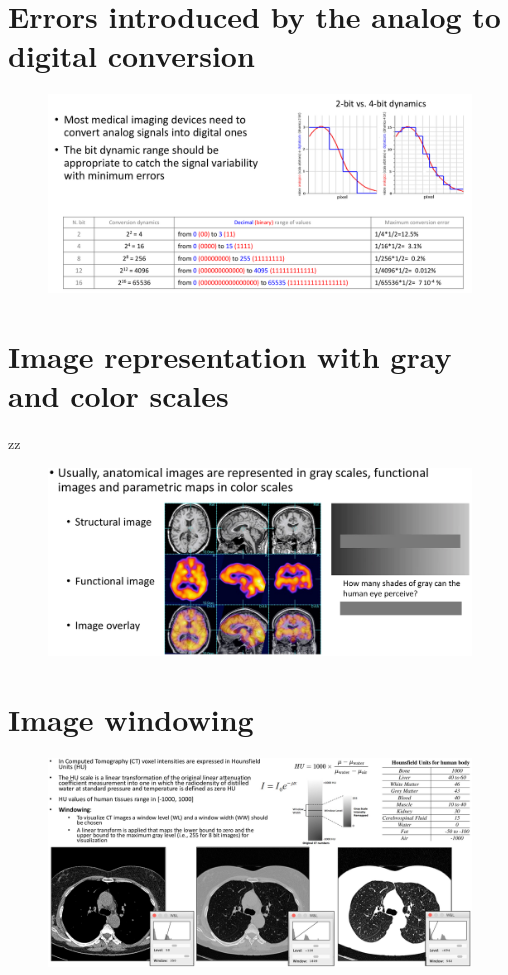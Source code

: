 \section{Errors introduced by the analog to digital conversion}

\begin{figure}[ht]
	\centering
	\includegraphics[width=0.8\linewidth]{figure_med/adc}
	
\end{figure}
\FloatBarrier


\section{Image representation with gray and color scales}
zz

\begin{figure}[ht]
	\centering
	\includegraphics[width=0.8\linewidth]{figure_med/gray}
\end{figure}
\FloatBarrier

\section{Image windowing}

\begin{figure}[ht]
	\centering
	\includegraphics[width=0.9\linewidth]{figure_med/img_windowing}
\end{figure}
\FloatBarrier

